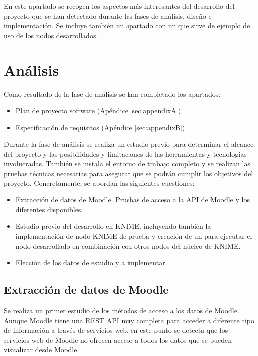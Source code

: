 
En este apartado se recogen los aspectos más interesantes del desarrollo del proyecto que se han detectado 
durante las fases de análisis, diseño e implementación. Se incluye también un apartado con un  que sirve
de ejemplo de uso de los nodos desarrollados. 

\section{Análisis}

Como resultado de la fase de análisis se han completado los apartados: 

\begin{itemize}
	\item Plan de proyecto software (Apéndice \ref{sec:appendixA})
	\item Especificación de requisitos (Apéndice \ref{sec:appendixB})
\end{itemize}

Durante la fase de análisis se realiza un estudio previo para determinar el alcance del proyecto y 
las posibilidades y limitaciones de las herramientas y tecnologías involucradas. También se instala el entorno
de trabajo completo y se realizan las pruebas técnicas necesarias para asegurar que se podrán cumplir los objetivos
del proyecto. Concretamente, se abordan las siguientes cuestiones: 

\begin{itemize}
	\item Extracción de datos de Moodle. Pruebas de acceso a la API de Moodle y los diferentes  disponibles. 
    \item Estudio previo del desarrollo en KNIME, incluyendo también la implementación de nodo KNIME de prueba y
	 creación de un  para ejecutar el nodo desarrollado en combinación con otros nodos del núcleo de KNIME.
	\item Elección de los datos de estudio y  a implementar.  
\end{itemize}


\subsection{Extracción de datos de Moodle}

Se realiza un primer estudio de los métodos de acceso a los datos de Moodle. Aunque Moodle tiene una REST API muy completa para acceder a diferente tipo de información a través de servicios 
web, en este punto se detecta que los servicios web de Moodle no ofrecen acceso a todos los
datos que se pueden visualizar desde Moodle. 
\

